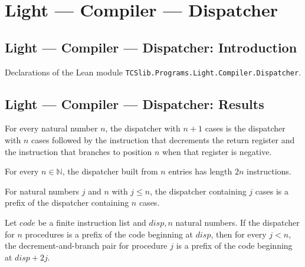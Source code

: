 \section{Light --- Compiler --- Dispatcher}
\subsection*{Light --- Compiler --- Dispatcher: Introduction}

Declarations of the Lean module \texttt{TCSlib.Programs.Light.Compiler.Dispatcher}.

\subsection*{Light --- Compiler --- Dispatcher: Results}

\begin{theorem}
\label{Light.Compiler.dispatcher_succ}
\leanok
{}
For every natural number $n$, the dispatcher with $n+1$ cases is the dispatcher with $n$
cases followed by the instruction that decrements the return register and the
instruction that branches to position $n$ when that register is negative.
\end{theorem}

\begin{theorem}
\label{Light.Compiler.length_dispatcher}
\leanok
{}
For every $n\in\mathbb N$, the dispatcher built from $n$ entries has length $2n$
instructions.
\end{theorem}

\begin{theorem}
\label{Light.Compiler.dispatcher_prefix}
\leanok
{}
For natural numbers $j$ and $n$ with $j\le n$, the dispatcher containing $j$ cases is a
prefix of the dispatcher containing $n$ cases.
\end{theorem}

\begin{theorem}
\label{Light.Compiler.codeAt_dispatcher}
\leanok
{}
Let $code$ be a finite instruction list and $disp,n$ natural numbers. If the dispatcher
for $n$ procedures is a prefix of the code beginning at $disp$, then for every $j<n$,
the decrement-and-branch pair for procedure $j$ is a prefix of the code beginning at
$disp+2j$.
\end{theorem}

